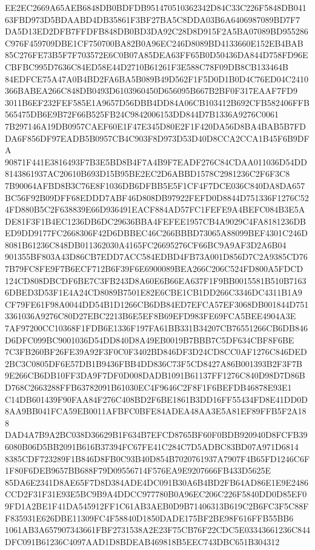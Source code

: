 \documentclass[UTF8,fontset=fandol,zihao=-4,a4paper]{ctexart}
\begin{document}
{{EE2EC2669A65AEB6848DB0BDFDB951470510362342D84C33C226F5848DB04163FBD973D5BDAABD4DB35861F3BF27BA5C8DDA03B6A6406987089BD7F7
DA5D13ED2DFB7FFDFB848DB0BD3DA92C28D8D915F2A5BA07089BD955286C976F459709DBE1CF750700BA82B0A96EC246D8089BD4133660E152EB4BAB
85C276FE73B5F7F703572E6C0B07A85DEA63FF65B0D50436DA844D758FD96ECBFBC995D7636C84ED58E44D2710B61261F3E588C78F09DB8CB133464B
84EDFCE75A47A0B4BD2FA6BA5B089B49D562F1F5D0D1B0D4C76ED04C2410366BABEA266C848DB0493D6103960450D656095B667B2BF0F317EAAF7FD9
3011B6EF232FEF585E1A9657D56DBB4DD84A06CB103412B692CFB582406FFB565475DB6E9B72F66B525FB24C9842006153DD844D7B1336A9276C0061
7B297146A19DB0957CAEF60E1F47E345D80E2F1F420DA56D8BA4BAB5B7FDDA6F856DF97EADB5B0957CB4C903F8D973D53D40D8CCA2CCA1B45F6B9DFA
90871F441E3816493F7B3E5BD8B4F7A4B9F7EADF276C84CDAA011036D54DD8143861937AC20610B693D15B95BE2EC2D6ABBD1578C2981236C2F6F3C8
7B90064AFBD8B3C76E8F1036DB6DFBB5E5F1CF4F7DCE036C840DA8DA657BC56F92B09DFF68EDDD7ABF46D808DB97922FEFD0D8844D751336F1276C52
4FD880B5C2F638839E66D936491EACF884AD57FC1FEFE9A4BEFC084B3E5ADE81F3F1B4EC1236DB6DC29636BBA4FEFEE1957CB4A9029C4FA8181236DB
ED9DD9177FC2668306F42D6DBBEC46C266BBBD73065A88099BEF4301C246D8081B61236C848DB011362030A4165FC26695276CF66BC9A9AF3D2A6B04
901355BF803A43D86CB7EDD7ACC584EDBD4FB73A001D856D7C2A9385CD767B79FC8FE9F7B6ECF712B6F39F6E6900089BEA266C206C524FD800A5FDCD
124CD808DBCDF6BE7C3FB243D8A60E6B66EA637F1F9BB0015581B510B71636DBED3D53F1E4A24CD8089B7501E82E6CBE1CB1DD266C3346DC4311B1A9
CF79FE61F98A0044DD54B1D1266CB6DB84ED7EFCA57EF3068DB001844D7513361036A9276C80D27EBC2213B6E5EF8B69EFD983FE69FCA5BEE4904A3E
7AF97200CC10368F1FDB6E1336F197FA61BB331B34207CB76551266CB6DB846D6DFC099BC9001036D54DD840D8A49EB0019B7BBB7C5DF634CBF8F6BE
7C3FB260BF26FE39A92F3F0C0F3402BD846DF3D24CD8CC0AF1276C846DED2BC3C0805DF6E57DB1B9436FBB4DD836C73F5CD8427A86B001393B2F3F7B
9E266CB6DB10FF3DA9F7DF0D008DADB1091B61137FF1276C840D98D7D86BD768C2663288FFB63782091B61030EC4F9646C2F8F1F6BEFDB46878E93E1
C14DB601439F90FAA84F276C408BD2F6BE1861B3DD16FF55434FD8E41DD0D8AA9BB041FCA59EB0011AFBFC0BFE84ADEA48AA3E5A81EF89FFB5F2A188
DAD4A7B9A2BC038D36629B1F634B7EFCD8765BF60F0BDB920940D8FCFB396080B06D5BB2091B616B37394FC67FE41C284C7D5ADBC83BD07A971D6814
8385CDF723289F1B846D8FB0C93B40D854B7020761937A7907F4B65FD1246C6F1F80F6DEB9657BB688F79D09556714F576EA9E9207666FB433D5625E
85DA6E2341D8AE65F7D8D384ADE4DC091B30A6B4BD2FB64AD86E1E9E2486CCD2F31F31E93E5BC9B9A4DDCC977780B0A96EC206C226F5840DD0D85EF0
9FD1A2BE1F41DA545912FF1C61AB3AEB0D9B71406313B619C2B6FC3F5C88FF835931E626DBE11309FC4F58840D1850DADE175BF2BE98F616FFB55BB6
1061AB3A657907343661FBF2731538A2E23F75CB76F22CDC5E03343661236C844DFC091B61236C4097AAD1D8BDEAB469818B5EEC743DBC651B304312
}}
\end{document}
